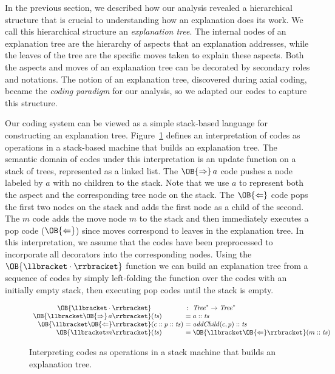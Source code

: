\documentclass[sigconf]{acmart}
\newcommand{\Push}{\OB{\Rightarrow}}
\newcommand{\Pop}{\OB{\Leftarrow}}
\newcommand{\Sem}[1]{\OB{\llbracket#1\rrbracket}}
\begin{document}
In the previous section, we described how our analysis revealed a hierarchical
structure that is crucial to understanding how an explanation does its work.
%
We call this hierarchical structure an \emph{explanation tree}. The internal
nodes of an explanation tree are the hierarchy of aspects that an explanation
addresses, while the leaves of the tree are the specific moves taken to explain
these aspects. Both the aspects and moves of an explanation tree can be
decorated by secondary roles and notations.
%
The notion of an explanation tree, discovered during axial coding, became the
\emph{coding paradigm} for our analysis, so we adapted our codes to capture
this structure.


Our coding system can be viewed as a simple stack-based language for
constructing an explanation tree. Figure~\ref{fig:semantics} defines an
interpretation of codes as operations in a stack-based machine that builds an
explanation tree.
%
The semantic domain of codes under this interpretation is an update function on
a stack of trees, represented as a linked list. The $\Push\,a$ code pushes a
node labeled by $a$ with no children to the stack. Note that we use $a$ to
represent both the aspect and the corresponding tree node on the stack. The
$\Pop$ code pops the first two nodes on the stack and adds the first node as a
child of the second. The $m$ code adds the move node $m$ to the stack and then
immediately executes a pop code ($\Pop$) since moves correspond to leaves in
the explanation tree.
%
In this interpretation, we assume that the codes have been preprocessed to
incorporate all decorators into the corresponding nodes.
%
Using the $\Sem{\cdot}$ function we can build an explanation tree from a
sequence of codes by simply left-folding the function over the codes with an
initially empty stack, then executing pop codes until the stack is empty.


\newcommand{\TS}{\mathit{ts}}

\begin{figure}
\[
\begin{array}{r@{}l@{~}l}
\Sem{\cdot}    &            &\,:~ \mathit{Tree}^* \to \mathit{Tree}^* \\
\Sem{\Push\,a} &(\TS)       &= a::\TS \\
\Sem{\Pop}     &(c::p::\TS) &= \mathit{addChild}(c,p)::\TS \\
\Sem{m}        &(\TS)       &= \Sem{\Pop}(m::\TS)
\end{array}
\]
\vspace{-1.5ex}
\caption{Interpreting codes as operations in a stack machine that builds an
explanation tree.}
\label{fig:semantics}
\end{figure}
\end{document}
